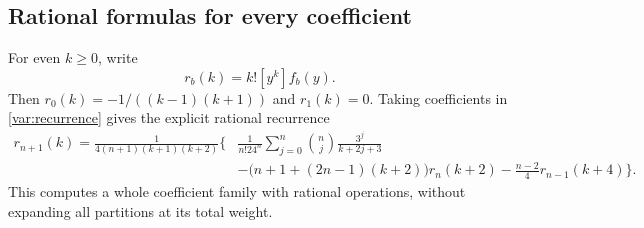 \documentclass[11pt,letterpaper]{article}
\numberwithin{equation}{section}
\theoremstyle{plain}
\theoremstyle{definition}
\theoremstyle{remark}
\begin{document}
\subsection{Rational formulas for every coefficient}

For even $k\ge0$, write
\[
 r_b(k)=k![y^k]f_b(y).
\]
Then $r_0(k)=-1/((k-1)(k+1))$ and $r_1(k)=0$.
Taking coefficients in \eqref{var:recurrence} gives the explicit
rational recurrence
\begin{equation}\label{var:rrecurrence}
\begin{split}
 r_{n+1}(k)=\frac1{4(n+1)(k+1)(k+2)}\bigg\{
 &\frac1{n!24^n}\sum_{j=0}^n
              \binom nj\frac{3^j}{k+2j+3}\\
 &-\bigl(n+1+(2n-1)(k+2)\bigr)r_n(k+2)
 -\frac{n-2}{4}r_{n-1}(k+4)\bigg\}.
\end{split}
\end{equation}
This computes a whole coefficient family with rational operations,
without expanding all partitions at its total weight.
\end{document}
